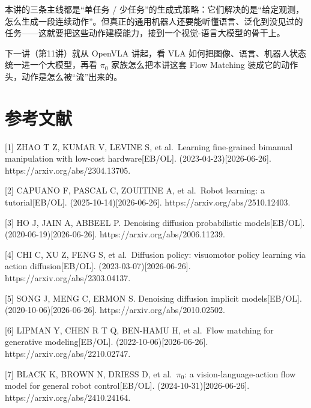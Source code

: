 \documentclass[
  chinese,
]{ctexart}
\begin{document}
本讲的三条主线都是``单任务 /
少任务''的生成式策略：它们解决的是``给定观测，怎么生成一段连续动作''。但真正的通用机器人还要能听懂语言、泛化到没见过的任务------这就要把这些动作建模能力，接到一个视觉-语言大模型的骨干上。

下一讲（第11讲）就从 OpenVLA 讲起，看 VLA
如何把图像、语言、机器人状态统一进一个大模型，再看 \(\pi_0\)
家族怎么把本讲这套 Flow Matching
装成它的动作头，动作是怎么被``流''出来的。

\section{参考文献}\label{ux53c2ux8003ux6587ux732e}

{[}1{]} ZHAO T Z, KUMAR V, LEVINE S, et al.~Learning fine-grained
bimanual manipulation with low-cost hardware{[}EB/OL{]}.
(2023-04-23){[}2026-06-26{]}. https://arxiv.org/abs/2304.13705.

{[}2{]} CAPUANO F, PASCAL C, ZOUITINE A, et al.~Robot learning: a
tutorial{[}EB/OL{]}. (2025-10-14){[}2026-06-26{]}.
https://arxiv.org/abs/2510.12403.

{[}3{]} HO J, JAIN A, ABBEEL P. Denoising diffusion probabilistic
models{[}EB/OL{]}. (2020-06-19){[}2026-06-26{]}.
https://arxiv.org/abs/2006.11239.

{[}4{]} CHI C, XU Z, FENG S, et al.~Diffusion policy: visuomotor policy
learning via action diffusion{[}EB/OL{]}. (2023-03-07){[}2026-06-26{]}.
https://arxiv.org/abs/2303.04137.

{[}5{]} SONG J, MENG C, ERMON S. Denoising diffusion implicit
models{[}EB/OL{]}. (2020-10-06){[}2026-06-26{]}.
https://arxiv.org/abs/2010.02502.

{[}6{]} LIPMAN Y, CHEN R T Q, BEN-HAMU H, et al.~Flow matching for
generative modeling{[}EB/OL{]}. (2022-10-06){[}2026-06-26{]}.
https://arxiv.org/abs/2210.02747.

{[}7{]} BLACK K, BROWN N, DRIESS D, et al.~\(\pi_0\): a
vision-language-action flow model for general robot control{[}EB/OL{]}.
(2024-10-31){[}2026-06-26{]}. https://arxiv.org/abs/2410.24164.
\end{document}

